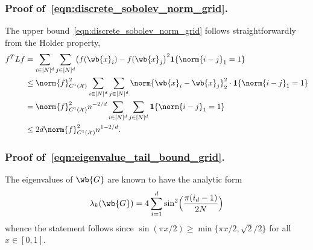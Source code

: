 \documentclass{article}
\newcommand{\1}{\mathbf{1}}
\newcommand{\Xset}{\mathcal{X}}
\theoremstyle{alden}
\theoremstyle{aldenthm}
\theoremstyle{definition}
\theoremstyle{remark}
\begin{document}
\subsubsection{Proof of~\eqref{eqn:discrete_sobolev_norm_grid}.}
The upper bound~\eqref{eqn:discrete_sobolev_norm_grid} follows straightforwardly from the Holder property,
\begin{align*}
f^T L f & = \sum_{i \in [N]^d} \sum_{j \in [N]^d} \bigl(f(\wb{x}_i) - f(\wb{x}_j\bigr)^2 \1\{\norm{i - j}_1 = 1\} \\
& \leq \norm{f}_{C^1(\Xset)}^2 \sum_{i \in [N]^d} \sum_{j \in [N]^d} \norm{\wb{x}_i - \wb{x}_j}_2^2 \cdot  \1\{\norm{i - j}_1 = 1\} \\
& = \norm{f}_{C^1(\Xset)}^2 n^{-2/d} \sum_{i \in [N]^d} \sum_{j \in [N]^d} \1\{\norm{i - j}_1 = 1\}  \\
& \leq 2d \norm{f}_{C^1(\Xset)}^2 n^{1 - 2/d}.
\end{align*}

\subsubsection{Proof of~\eqref{eqn:eigenvalue_tail_bound_grid}.}
The eigenvalues of $\wb{G}$ are known to have the analytic form
\begin{equation*}
\lambda_k(\wb{G}) = 4 \sum_{i = 1}^{d} \sin^2\Bigl(\frac{\pi(i_d - 1)}{2N}\Bigr)
\end{equation*}
whence the statement follows since $\sin(\pi x /2) \geq \min\{\pi x/2,\sqrt{2}/2 \}$ for all $x \in [0,1]$.
\end{document}
